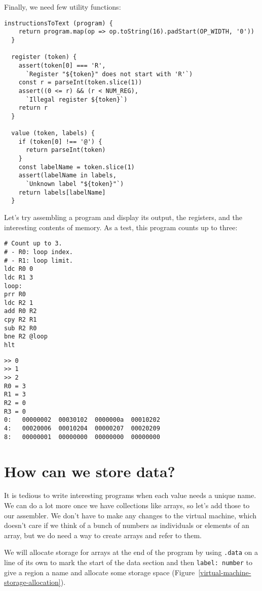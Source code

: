 \documentclass[krantzl]{krantz}
\newcommand{\figref}[1]{Figure~\ref{#1}}
\begin{document}
Finally, we need few utility functions:


\begin{lstlisting}[frame=tblr]
  instructionsToText (program) {
    return program.map(op => op.toString(16).padStart(OP_WIDTH, '0'))
  }

  register (token) {
    assert(token[0] === 'R',
      `Register "${token}" does not start with 'R'`)
    const r = parseInt(token.slice(1))
    assert((0 <= r) && (r < NUM_REG),
      `Illegal register ${token}`)
    return r
  }

  value (token, labels) {
    if (token[0] !== '@') {
      return parseInt(token)
    }
    const labelName = token.slice(1)
    assert(labelName in labels,
      `Unknown label "${token}"`)
    return labels[labelName]
  }
\end{lstlisting}



Let’s try assembling a program and display its output,
the registers,
and the interesting contents of memory.
As a test,
this program counts up to three:


\begin{lstlisting}[frame=tblr]
# Count up to 3.
# - R0: loop index.
# - R1: loop limit.
ldc R0 0
ldc R1 3
loop:
prr R0
ldc R2 1
add R0 R2
cpy R2 R1
sub R2 R0
bne R2 @loop
hlt
\end{lstlisting}



\begin{lstlisting}[frame=tblr,backgroundcolor=\color{black!5}]
>> 0
>> 1
>> 2
R0 = 3
R1 = 3
R2 = 0
R3 = 0
0:   00000002  00030102  0000000a  00010202
4:   00020006  00010204  00000207  00020209
8:   00000001  00000000  00000000  00000000
\end{lstlisting}


\section{How can we store data?}\label{virtual-machine-data}


It is tedious to write interesting programs when each value needs a unique name.
We can do a lot more once we have collections like arrays,
so let’s add those to our assembler.
We don’t have to make any changes to the virtual machine,
which doesn’t care if we think of a bunch of numbers as individuals or elements of an array,
but we do need a way to create arrays and refer to them.


We will allocate storage for arrays at the end of the program
by using \texttt{.data} on a line of its own to mark the start of the data section
and then \texttt{label: number} to give a region a name and allocate some storage space
(\figref{virtual-machine-storage-allocation}).
\end{document}
